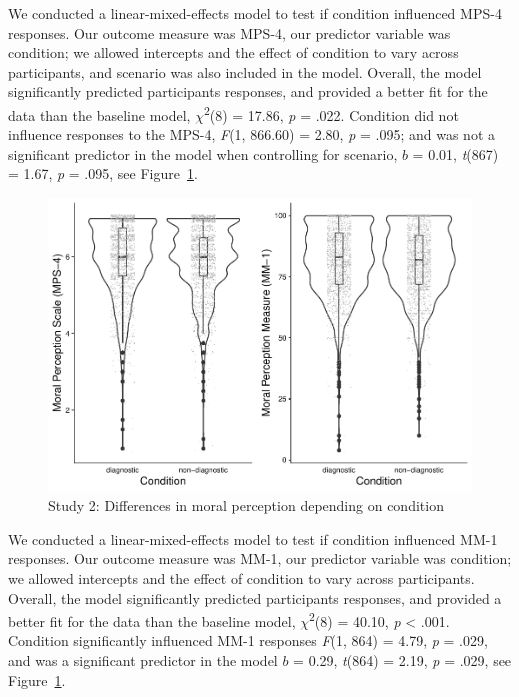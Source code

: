 \documentclass[
  english,
  man,floatsintext]{apa7}
\begin{document}
We conducted a linear-mixed-effects model to test if condition influenced MPS-4 responses. Our outcome measure was MPS-4, our predictor variable was condition; we allowed intercepts and the effect of condition to vary across participants, and scenario was also included in the model.
Overall, the model significantly predicted participants responses, and provided a better fit for the data than the baseline model, \(\chi\)\textsuperscript{2}(8) = 17.86, \emph{p} = .022. Condition did not influence responses to the MPS-4, \emph{F}(1, 866.60) = 2.80, \emph{p} = .095; and was not a significant predictor in the model when controlling for scenario, \(b\) = 0.01, \emph{t}(867) = 1.67, \emph{p} = .095, see Figure~\ref{fig:S4bothconditionplot}.

\begin{figure}
\centering
\includegraphics{moral_dilution_in_chunks_files/figure-latex/S4bothconditionplot-1.pdf}
\caption{\label{fig:S4bothconditionplot}Study 2: Differences in moral perception depending on condition}
\end{figure}

We conducted a linear-mixed-effects model to test if condition influenced MM-1 responses. Our outcome measure was MM-1, our predictor variable was condition; we allowed intercepts and the effect of condition to vary across participants. Overall, the model significantly predicted participants responses, and provided a better fit for the data than the baseline model, \(\chi\)\textsuperscript{2}(8) = 40.10, \emph{p} \textless{} .001. Condition significantly influenced MM-1 responses \emph{F}(1, 864) = 4.79, \emph{p} = .029, and was a significant predictor in the model \(b\) = 0.29, \emph{t}(864) = 2.19, \emph{p} = .029, see Figure~\ref{fig:S4bothconditionplot}.
\end{document}
